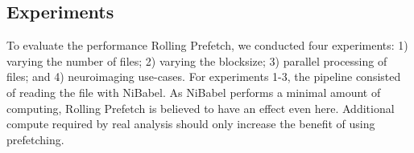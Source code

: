 


\subsection{Experiments}
To evaluate the performance Rolling Prefetch, we conducted four experiments: 1)
varying the number of files; 2) varying the blocksize; 3) parallel processing of
files;  and 4) neuroimaging use-cases. For experiments 1-3, the pipeline
consisted of reading the file with NiBabel. As NiBabel performs a minimal amount
of computing, Rolling Prefetch is believed to have an effect even here.
Additional compute required by real analysis should only increase the benefit of
using prefetching.

